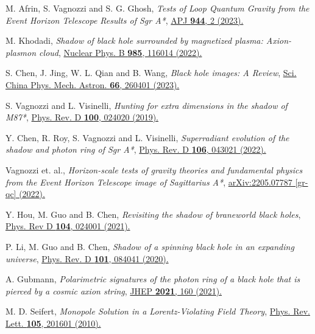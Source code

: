 \documentclass[aps,amsmath,amssymb,showpacs,showkeys]{revtex4}
\begin{document}
\begin{thebibliography}{99}
M. Afrin, S. Vagnozzi and S. G. Ghosh, \textit{Tests of Loop Quantum Gravity from the Event Horizon Telescope Results of Sgr A*}, \href{https://iopscience.iop.org/article/10.3847/1538-4357/acb334}{APJ \textbf{944}, 2 (2023).}

M. Khodadi, \textit{Shadow of black hole surrounded by magnetized plasma: Axion-plasmon cloud}, \href{https://www.sciencedirect.com/science/article/pii/S0550321322003650?via%3Dihub}{Nuclear Phys. B \textbf{985}, 116014 (2022).}

S. Chen, J. Jing, W. L. Qian and B. Wang, \textit{Black hole images: A Review}, \href{https://link.springer.com/article/10.1007/s11433-022-2059-5#citeas}{Sci. China Phys. Mech. Astron. \textbf{66}, 260401 (2023).}

S. Vagnozzi and L. Visinelli, \textit{Hunting for extra dimensions in the shadow of M87*}, \href{https://journals.aps.org/prd/abstract/10.1103/PhysRevD.100.024020}{Phys. Rev. D \textbf{100}, 024020 (2019).}

Y. Chen, R. Roy, S. Vagnozzi and L. Visinelli, \textit{Superradiant evolution of the shadow and photon ring of Sgr A*}, \href{https://journals.aps.org/prd/abstract/10.1103/PhysRevD.106.043021}{Phys. Rev. D \textbf{106}, 043021 (2022).}

Vagnozzi et. al., \textit{Horizon-scale tests of gravity theories and fundamental physics from the Event Horizon Telescope image of Sagittarius A*}, \href{https://doi.org/10.48550/arXiv.2205.07787}{arXiv:2205.07787 [gr-qc] (2022).}

Y. Hou, M. Guo and B. Chen, \textit{Revisiting the shadow of braneworld black holes}, \href{https://journals.aps.org/prd/abstract/10.1103/PhysRevD.104.024001}{Phys. Rev D \textbf{104}, 024001 (2021).}

P. Li, M. Guo and B. Chen, \textit{Shadow of a spinning black hole in an expanding universe}, \href{https://journals.aps.org/prd/abstract/10.1103/PhysRevD.101.084041}{Phys. Rev. D \textbf{101}, 084041 (2020).}

A. Gubmann, \textit{Polarimetric signatures of the photon ring of a black hole that is pierced by a cosmic axion string}, \href{https://link.springer.com/article/10.1007/JHEP08(2021)160#citeas}{JHEP \textbf{2021}, 160 (2021).}


 M. D. Seifert, \textit{Monopole Solution in a Lorentz-Violating Field Theory}, \href{https://journals.aps.org/prl/pdf/10.1103/PhysRevLett.105.201601}{Phys. Rev. Lett. \textbf{105}, 201601 (2010).}


\end{thebibliography}
\end{document}
